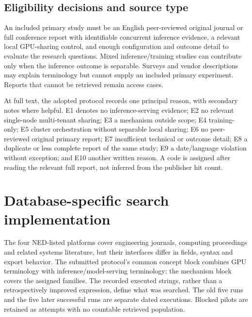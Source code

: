\subsection{Eligibility decisions and source type}
An included primary study must be an English peer-reviewed original journal or full conference report with identifiable concurrent inference evidence, a relevant local GPU-sharing control, and enough configuration and outcome detail to evaluate the research questions. Mixed inference/training studies can contribute only when the inference outcome is separable. Surveys and vendor descriptions may explain terminology but cannot supply an included primary experiment. Reports that cannot be retrieved remain access cases.

At full text, the adopted protocol records one principal reason, with secondary notes where helpful. E1 denotes no inference-serving evidence; E2 no relevant single-node multi-tenant sharing; E3 a mechanism outside scope; E4 training-only; E5 cluster orchestration without separable local sharing; E6 no peer-reviewed original primary report; E7 insufficient technical or outcome detail; E8 a duplicate or less complete report of the same study; E9 a date/language violation without exception; and E10 another written reason. A code is assigned after reading the relevant full report, not inferred from the publisher hit count. 

\section{Database-specific search implementation}
\label{sec:search-detail}
\newcommand{\MasterQuery}{\begingroup\footnotesize\ttfamily (GPU OR "graphics processing unit") AND (inference OR "model serving" OR "deep learning" OR DNN OR LLM) AND ("time slicing" OR "time sharing" OR "context switching" OR MPS OR "multi-process service" OR MIG OR "multi-instance GPU" OR "GPU partitioning" OR "API remoting" OR "CUDA remoting" OR "GPU proxy" OR "GPU virtualization")\endgroup}
The four NED-listed platforms cover engineering journals, computing proceedings and related systems literature, but their interfaces differ in fields, syntax and export behavior. The submitted protocol's common concept block combines GPU terminology with inference/model-serving terminology; the mechanism block covers the assigned families. The recorded executed strings, rather than a retrospectively improved expression, define what was searched. The old five runs and the five later successful runs are separate dated executions. Blocked pilots are retained as attempts with no countable retrieved population.


